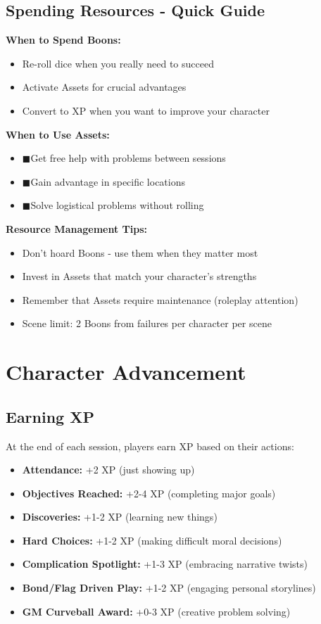 \documentclass[11pt]{article}
\newcommand{\boon}{\textcolor{booncolor}{\ding{72}}}
\newcommand{\asset}{\textcolor{assetcolor}{$\blacksquare$}}
\begin{document}
\subsection{Spending Resources - Quick Guide}

\textbf{When to Spend Boons:}
\begin{itemize}
\item \boon Re-roll dice when you really need to succeed
\item \boon Activate Assets for crucial advantages
\item \boon Convert to XP when you want to improve your character
\end{itemize}

\textbf{When to Use Assets:}
\begin{itemize}
\item \asset Get free help with problems between sessions
\item \asset Gain advantage in specific locations
\item \asset Solve logistical problems without rolling
\end{itemize}

\textbf{Resource Management Tips:}
\begin{itemize}
\item Don't hoard Boons - use them when they matter most
\item Invest in Assets that match your character's strengths
\item Remember that Assets require maintenance (roleplay attention)
\item Scene limit: 2 Boons from failures per character per scene
\end{itemize}

\section{Character Advancement}

\subsection{Earning XP}

At the end of each session, players earn XP based on their actions:
\begin{itemize}
\item \textbf{Attendance:} +2 XP (just showing up)
\item \textbf{Objectives Reached:} +2-4 XP (completing major goals)
\item \textbf{Discoveries:} +1-2 XP (learning new things)
\item \textbf{Hard Choices:} +1-2 XP (making difficult moral decisions)
\item \textbf{Complication Spotlight:} +1-3 XP (embracing narrative twists)
\item \textbf{Bond/Flag Driven Play:} +1-2 XP (engaging personal storylines)
\item \textbf{GM Curveball Award:} +0-3 XP (creative problem solving)
\end{itemize}
\end{document}
